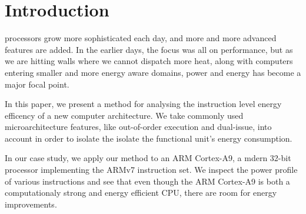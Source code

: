 \section{Introduction}

 processors grow more sophisticated each day, and
more and more advanced features are added. In the earlier days, the focus
was all on performance, but as we are hitting walls where we cannot dispatch
more heat, along with computers entering smaller and more energy aware domains,
power and energy has become a major focal point.

In this paper, we present a method for analysing the instruction level energy
efficency of a new computer architecture. We take commonly used
microarchitecture features, like out-of-order execution and dual-issue, into
account in order to isolate the isolate the functional unit's energy consumption.

In our case study, we apply our method to an ARM Cortex-A9, a mdern 32-bit
processor implementing the ARMv7 instruction set. We inspect the power
profile of various instructions and see that even though the ARM
Cortex-A9 is both a computationaly strong and energy efficient CPU, there are
room for energy improvements.


